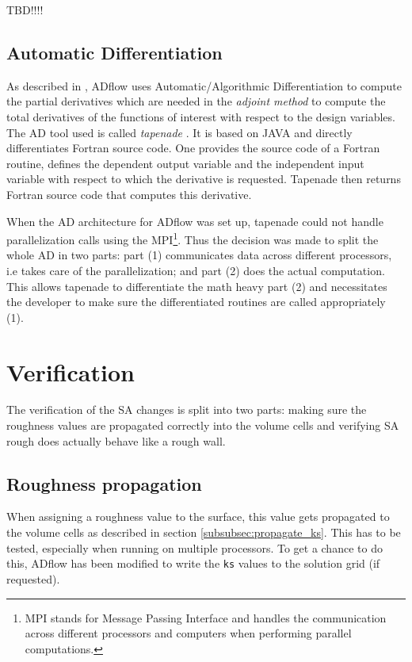TBD!!!!

\subsection{Automatic Differentiation}
As described in \cite{cm1}, ADflow uses Automatic/Algorithmic Differentiation to
compute the partial derivatives which are needed in the \textit{adjoint method}
to compute the total derivatives of the functions of interest with respect to
the design variables. The AD tool used is called \textit{tapenade}
\cite{tapenade}. It is based on JAVA and directly differentiates Fortran source
code. One provides the source code of a Fortran routine, defines the dependent
output variable and the independent input variable with respect to which the
derivative is requested. Tapenade then returns Fortran source code that
computes this derivative.

When the AD architecture for ADflow was set up, tapenade could not handle
parallelization calls using the MPI\footnote{MPI stands for Message Passing
Interface and handles the communication across different processors and
computers when performing parallel computations.}. Thus the decision was made to
split the whole AD in two parts: part (1) communicates data across different
processors, i.e takes care of the parallelization; and part (2) does the actual
computation. This allows tapenade to differentiate the math heavy part (2) and
necessitates the developer to make sure the differentiated routines are called
appropriately (1).


\section{Verification}
The verification of the SA changes is split into two parts: making sure the
roughness values are propagated correctly into the volume cells and verifying SA
rough does actually behave like a rough wall.

\subsection{Roughness propagation}
\label{subsec:roughness_prop}
When assigning a roughness value to the surface, this value gets propagated to
the volume cells as described in section \ref{subsubsec:propagate_ks}. This has
to be tested, especially when running on multiple processors. To get a chance to
do this, ADflow has been modified to write the \texttt{ks} values to the
solution grid (if requested).

